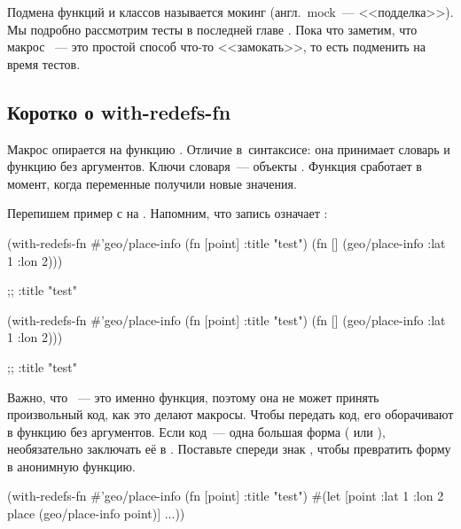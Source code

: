 \fi


Подмена функций и классов называется мокинг (англ.~mock~--- <<подделка>>). Мы
подробно рассмотрим тесты в последней главе . Пока что
заметим, что макрос ~--- это простой способ что-то <<замокать>>,
то есть подменить на время тестов.

\subsection{Коротко о with-redefs-fn}


Макрос  опирается на функцию . Отличие
в~синтаксисе: она принимает словарь и функцию без аргументов. Ключи словаря~---
объекты . Функция сработает в момент, когда переменные получили новые
значения.

Перепишем пример с  на . Напомним, что
запись  означает :

\ifnarrow

\begin{clojure}
(with-redefs-fn
  {#'geo/place-info (fn [point]
                      {:title "test"})}
  (fn []
    (geo/place-info {:lat 1 :lon 2})))

;; {:title "test"}
\end{clojure}

\else

\begin{clojure}
(with-redefs-fn
  {#'geo/place-info (fn [point] {:title "test"})}
  (fn []
    (geo/place-info {:lat 1 :lon 2})))

;; {:title "test"}
\end{clojure}

\fi


Важно, что ~--- это именно функция, поэтому она не может
принять произвольный код, как это делают макросы. Чтобы передать код, его
оборачивают в функцию без аргументов. Если код~--- одна большая форма
( или ), необязательно заключать её в
. Поставьте спереди знак \code{\#}, чтобы превратить форму в
анонимную функцию.

\ifnarrow

\begin{clojure}
(with-redefs-fn
  {#'geo/place-info (fn [point]
                      {:title "test"})}
  #(let [point {:lat 1 :lon 2}
         place (geo/place-info point)]
     ...))
\end{clojure}

